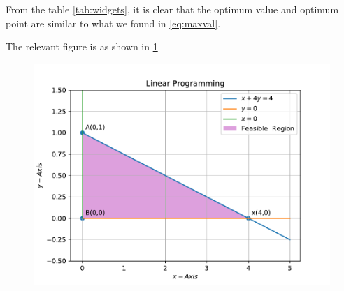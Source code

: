 \documentclass[12pt]{article}
\begin{document}
\begin{enumerate}
\begin{enumerate}
From the table \ref{tab:widgets}, it is clear that the optimum value and optimum point are similar to what we found in \eqref{eq:maxval}. 
\end{enumerate}
The relevant figure is as shown in \ref{fig:inequality}
\begin{figure}[!h]
	\begin{center}
		\includegraphics[width=\columnwidth]{figs/problem1.pdf}
	\end{center}
	\caption{\label{fig:inequality}}
\end{figure}
\end{enumerate}
\end{document}
